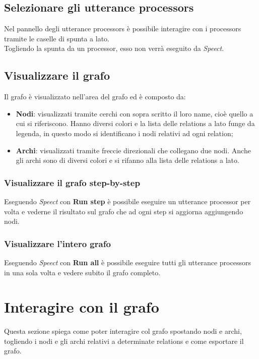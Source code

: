 \documentclass[openany,12pt,a4paper]{report}
\begin{document}
	\subsection{Selezionare gli utterance processors}
	Nel pannello degli utterance processors è possibile interagire con i processors tramite le caselle di spunta a lato.\\
	Togliendo la spunta da un processor, esso non verrà eseguito da \textit{Speect}.
	
	\subsection{Visualizzare il grafo}
	Il grafo è visualizzato nell'area del grafo ed è composto da:
	\begin{itemize}
		\item \textbf{Nodi}: visualizzati tramite cerchi con sopra scritto il loro name, cioè quello a cui si riferiscono. Hanno diversi colori e la lista delle relations a lato funge da legenda, in questo modo si identificano i nodi relativi ad ogni relation;
		\item \textbf{Archi}: visualizzati tramite freccie direzionali che collegano due nodi. Anche gli archi sono di diversi colori e si rifanno alla lista delle relations a lato.
	\end{itemize}
	 
	\subsubsection{Visualizzare il grafo step-by-step}
	Eseguendo \textit{Speect} con \textbf{Run step} è possibile eseguire un utterance processor per volta e vederne il risultato sul grafo che ad ogni step si aggiorna aggiungendo nodi.
	
	\subsubsection{Visualizzare l'intero grafo}
	Eseguendo \textit{Speect} con \textbf{Run all} è possibile eseguire tutti gli utterance processors in una sola volta e vedere subito il grafo completo.
	
	\section{Interagire con il grafo}
	Questa sezione spiega come poter interagire col grafo spostando nodi e archi, togliendo i nodi e gli archi relativi a determinate relations e come esportare il grafo.
	
\end{document}
